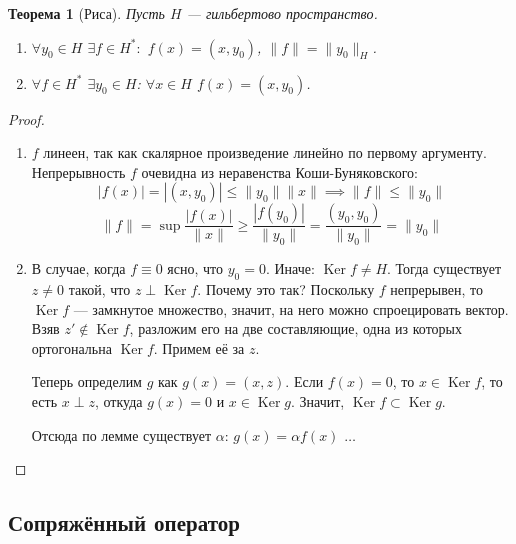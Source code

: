 \documentclass[11pt,openany,a4paper]{scrartcl}
\theoremstyle{plain}
\newtheorem{theorem}{Теорема}[subsection]
\theoremstyle{definition}
\DeclareMathOperator{\Ker}{Ker}
\begin{document}
\begin{theorem}[Риса]
    Пусть $H$ — гильбертово пространство.
    \begin{enumerate}
        \item $\forall y_0 \in H$ $\exists f \in H^\ast:$ $f(x) = (x, y_0)$,
        $\|f\| = \|y_0\|_H$.
        \item $\forall f \in H^\ast$ $\exists y_0 \in H$: $\forall x \in H$
        $f(x) = (x, y_0)$.
    \end{enumerate}
\end{theorem}
\begin{proof}
\mbox{}
    \begin{enumerate}
        \item $f$ линеен, так как скалярное произведение линейно по первому 
        аргументу. Непрерывность $f$ очевидна из неравенства Коши-Буняковского:
        $$
        |f(x)| = |(x, y_0)| \leqslant \|y_0\|\|x\| \implies
        \|f\| \leqslant \|y_0\|
        $$
        $$
        \|f\| = \sup \frac{|f(x)|}{\|x\|} \geqslant \frac{|f(y_0)|}{\|y_0\|} =
        \frac{(y_0, y_0)}{\|y_0\|} = \|y_0\|
        $$
        \item В случае, когда $f \equiv 0$ ясно, что $y_0 = 0$.
        Иначе: $\Ker f \neq H$. Тогда существует $z \neq 0$ такой, что
        $z \perp \Ker f$. Почему это так? Поскольку $f$ непрерывен, то $\Ker f$ —
        замкнутое множество, значит, на него можно спроецировать вектор. Взяв
        $z' \notin \Ker f$, разложим его на две составляющие, одна из которых
        ортогональна $\Ker f$. Примем её за $z$.
        
        Теперь определим $g$ как $g(x) = (x, z)$. Если $f(x) = 0$, то
        $x \in \Ker f$, то есть $x \perp z$, откуда $g(x) = 0$ и $x \in \Ker g$.
        Значит, $\Ker f \subset \Ker g$.
        
        Отсюда по лемме существует $\alpha$: $g(x) = \alpha f(x)$
        $\ldots$
    \end{enumerate}
\end{proof}

\subsection{Сопряжённый оператор}
\end{document}
